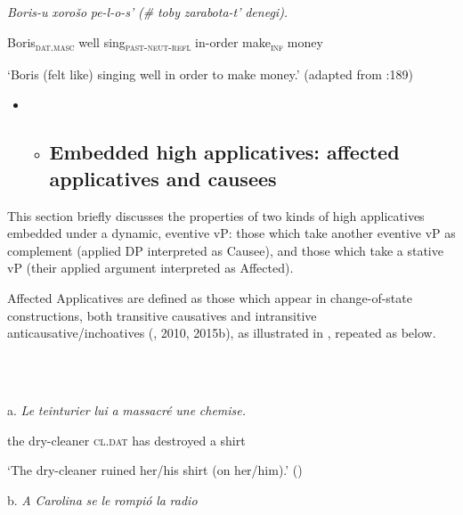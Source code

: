 \documentclass[output=paper,modfonts,nonflat]{langsci/langscibook}
\begin{document}
\ea%
    \label{ex:key:11}
    \gll\\
        \\
    \glt
    \z

          \textit{Boris-u} \textit{xorošo} \textit{pe-l-o-s’} \textit{(\#} \textit{toby} \textit{zarabota-t’} \textit{denegi).}

  Boris\textsc{\textsubscript{dat.masc}}   well sing\textsc{\textsubscript{past-neut-refl}}   in-order make\textsc{\textsubscript{inf}} money

  ‘Boris (felt like) singing well in order to make money.’   (adapted from \citealt{Skorniakova2009}:189)

\begin{itemize}
\item \begin{itemize}
\item \subsection{Embedded high applicatives: affected applicatives and causees}
\end{itemize}
\end{itemize}

This section briefly discusses the properties of two kinds of high applicatives embedded under a dynamic, eventive vP: those which take another eventive vP as complement (applied DP interpreted as Causee), and those which take a stative vP (their applied argument interpreted as Affected). 

Affected Applicatives are defined as those which appear in change-of-state constructions, both transitive causatives and intransitive anticausative/inchoatives (\citealt{Cuervo2003}, 2010, 2015b), as illustrated in , repeated as  below. 

\ea%
    \label{ex:key:12}
    \gll\\
        \\
    \glt
    \z

           a.    \textit{Le} \textit{teinturier} \textit{lui} \textit{a} \textit{massacré} \textit{une} \textit{chemise.} 

    the dry-cleaner \textsc{cl.dat} has destroyed a shirt

    ‘The dry-cleaner ruined her/his shirt (on her/him).’  (\citealt{BonehNash2012})    

b.   \textit{A} \textit{Carolina}     \textit{se}         \textit{le}      \textit{rompió}   \textit{la} \textit{radio} 
\end{document}

